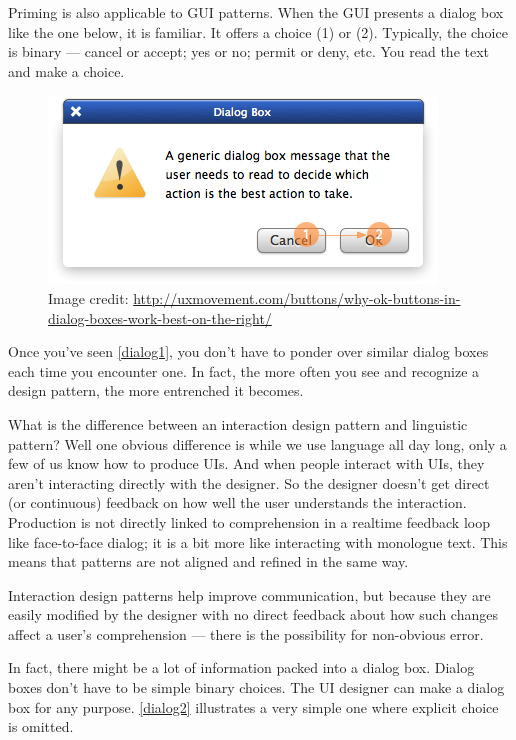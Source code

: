 Priming is also applicable to GUI patterns. When the GUI presents a dialog box like the one below, it is familiar. It offers a choice (1) or (2). Typically, the choice is binary --- cancel or accept; yes or no; permit or deny, etc. You read the text and make a choice. 


\begin{figure}
\centerline{
\includegraphics[scale=.5]{chapter8.tex/dialog1}
}
\caption{Image credit: \url{http://uxmovement.com/buttons/why-ok-buttons-in-dialog-boxes-work-best-on-the-right/}}
\label{dialog1}
\end{figure}


Once you've seen  \autoref{dialog1},  you don't have to ponder over similar dialog boxes each time you encounter one. In fact, the more often you see and recognize a design pattern, the more entrenched it becomes. 

What is the difference between an interaction design pattern and linguistic pattern? Well one obvious difference is while we use language all day long, only a few of us know how to produce UIs. And when people interact with UIs, they aren't interacting directly with the designer. So the designer doesn't get direct (or continuous) feedback on how well the user understands the interaction. Production is not directly linked to comprehension in a realtime feedback loop like face-to-face dialog; it is a bit more like interacting with monologue text. This means that patterns are not aligned and refined in the same way. 

Interaction design patterns help improve communication, but because they are easily modified by the designer with no direct feedback about how such changes affect a user's comprehension --- there is the possibility for non-obvious error. 

In fact, there might be a lot of information packed into a dialog box. Dialog boxes don't have to be simple binary choices. The UI designer can make a dialog box for any purpose.  \autoref{dialog2}  illustrates a very simple one where explicit choice is omitted. 


